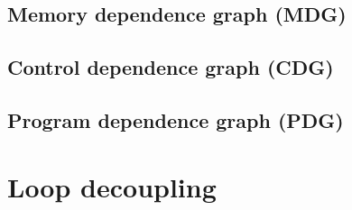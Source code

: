 \subsection{Memory dependence graph (MDG)} \label{background-mdg}
\subsection{Control dependence graph (CDG)} \label{background-cdg}
\subsection{Program dependence graph (PDG)} \label{background-pdg}

\section{Loop decoupling} \label{background-loop-decoupling}

\cite{iterator-recognition}